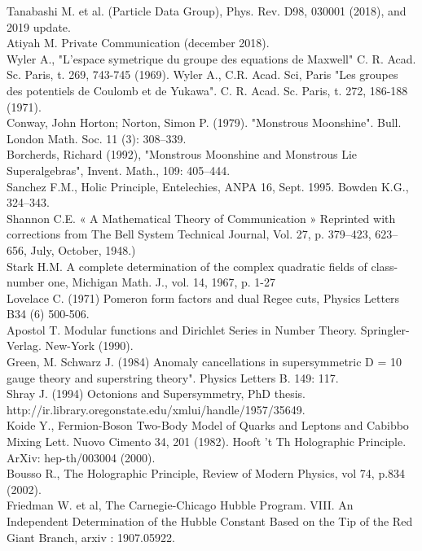 \documentclass[a4paper,9pt]{article}
\begin{document}
\begin{thebibliography}{99}
 Tanabashi M. et al. (Particle Data Group), Phys. Rev. D98, 030001 (2018), and 2019 update.\\
 Atiyah M. Private Communication (december 2018).\\
 Wyler A., "L'espace symetrique du groupe des equations de Maxwell" C. R. Acad. Sc. Paris, t. 269, 743-745 (1969). Wyler A., C.R. Acad. Sci, Paris "Les groupes des potentiels de Coulomb et de Yukawa". C. R. Acad. Sc. Paris, t. 272, 186-188 (1971).\\
 Conway, John Horton; Norton, Simon P. (1979). "Monstrous Moonshine". Bull. London Math. Soc. 11 (3): 308--339.\\
 Borcherds, Richard (1992), "Monstrous Moonshine and Monstrous Lie Superalgebras", Invent. Math., 109: 405--444.\\
  Sanchez F.M., Holic Principle, Entelechies, ANPA 16, Sept. 1995. Bowden K.G., 324--343.\\
 Shannon C.E. « A Mathematical Theory of Communication » Reprinted with corrections from The Bell System Technical Journal, Vol. 27, p. 379–423, 623–656, July, October, 1948.)\\
 Stark H.M. A complete determination of the complex quadratic fields of class-number one, Michigan Math. J., vol. 14,‎ 1967, p. 1-27  \\
 Lovelace C. (1971) Pomeron form factors and dual Regee cuts, Physics Letters B34 (6) 500-506.\\
 Apostol T. Modular functions and Dirichlet Series in Number Theory. Springler-Verlag. New-York (1990).\\
 Green, M. Schwarz J. (1984)  Anomaly cancellations in supersymmetric D = 10 gauge theory and superstring theory". Physics Letters B. 149: 117.\\
 Shray J. (1994) Octonions and Supersymmetry, PhD thesis.  http://ir.library.oregonstate.edu/xmlui/handle/1957/35649. \\
 Koide Y., Fermion-Boson Two-Body Model of Quarks and Leptons and Cabibbo Mixing  Lett. Nuovo Cimento 34, 201 (1982). 
 Hooft 't Th Holographic Principle. ArXiv: hep-th/003004 (2000). \\
 Bousso R., The Holographic Principle, Review of Modern Physics, vol 74, p.834 (2002).\\
 Friedman W. et al, The Carnegie-Chicago Hubble Program. VIII. An Independent Determination of the Hubble Constant Based on the Tip of the Red Giant Branch, arxiv : 1907.05922.\\ 

\end{thebibliography}
\end{document}

